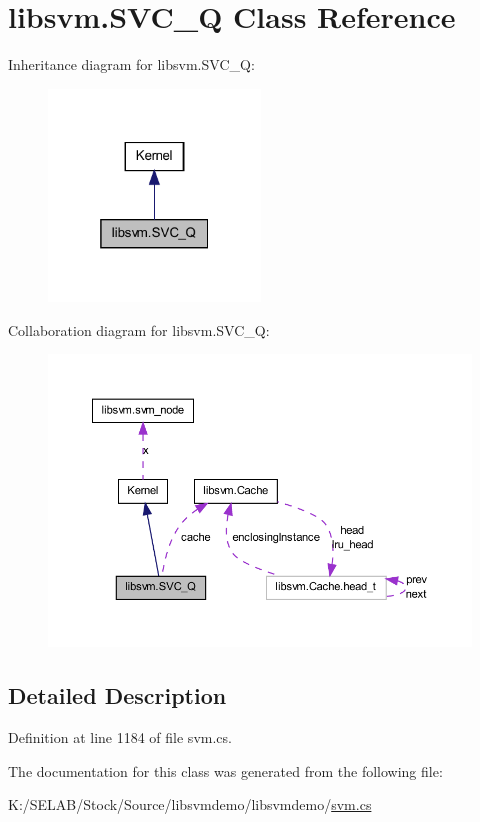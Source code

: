 \hypertarget{classlibsvm_1_1_s_v_c___q}{
\section{libsvm.SVC\_\-Q Class Reference}
\label{classlibsvm_1_1_s_v_c___q}
}


Inheritance diagram for libsvm.SVC\_\-Q:
\nopagebreak
\begin{figure}[H]
\begin{center}
\leavevmode
\includegraphics[width=160pt]{classlibsvm_1_1_s_v_c___q__inherit__graph}
\end{center}
\end{figure}


Collaboration diagram for libsvm.SVC\_\-Q:
\nopagebreak
\begin{figure}[H]
\begin{center}
\leavevmode
\includegraphics[width=379pt]{classlibsvm_1_1_s_v_c___q__coll__graph}
\end{center}
\end{figure}


\subsection{Detailed Description}


Definition at line 1184 of file svm.cs.



The documentation for this class was generated from the following file:\begin{DoxyCompactItemize}
\item 
K:/SELAB/Stock/Source/libsvmdemo/libsvmdemo/\hyperlink{svm_8cs}{svm.cs}\end{DoxyCompactItemize}
